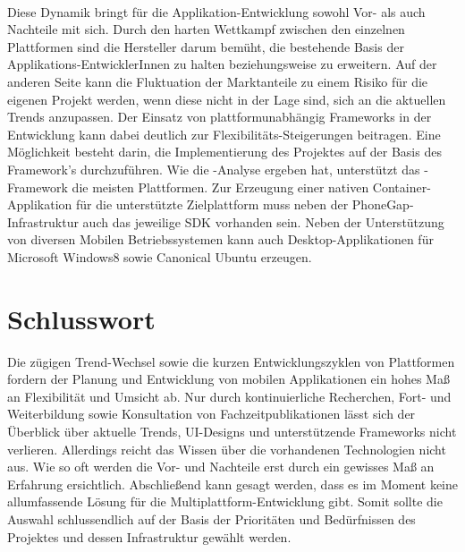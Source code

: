 \documentclass[Bachelorarbeit.tex]{subfiles}
\begin{document}
\mbox{}\\
Diese Dynamik bringt für die Applikation-Entwicklung sowohl Vor- als auch Nachteile mit sich. 
Durch den harten Wettkampf zwischen den einzelnen Plattformen sind die Hersteller darum bemüht, die bestehende Basis der Applikations-EntwicklerInnen zu halten beziehungsweise zu erweitern.
Auf der anderen Seite kann die Fluktuation der Marktanteile zu einem Risiko für die eigenen Projekt werden, wenn diese nicht in der Lage sind, sich an die aktuellen Trends anzupassen.
Der Einsatz von plattformunabhängig Frameworks in der Entwicklung kann dabei deutlich zur Flexibilitäts-Steigerungen beitragen.   
Eine Möglichkeit besteht darin, die Implementierung des Projektes auf der Basis des  Framework's durchzuführen.
Wie die -Analyse ergeben hat, unterstützt das -Framework die meisten Plattformen.
Zur Erzeugung einer nativen Container-Applikation für die  unterstützte Zielplattform muss neben der PhoneGap-Infrastruktur auch das jeweilige \ac{SDK} vorhanden sein.
Neben der Unterstützung von diversen Mobilen Betriebssystemen kann  auch Desktop-Applikationen für Microsoft Windows8 sowie Canonical Ubuntu erzeugen. \parencite[vgl.:][]{phonegapPlatformGuides}\\
\newpage
\section{Schlusswort}\label{sec:schlusswort}
Die zügigen Trend-Wechsel sowie die kurzen Entwicklungszyklen von Plattformen fordern der Planung und Entwicklung von mobilen Applikationen ein hohes Maß an Flexibilität und Umsicht ab. 
Nur durch kontinuierliche Recherchen, Fort- und Weiterbildung sowie Konsultation von Fachzeitpublikationen lässt sich der Überblick über aktuelle Trends, \ac{UI}-Designs und unterstützende Frameworks nicht verlieren.
Allerdings reicht das Wissen über die vorhandenen Technologien nicht aus. 
Wie so oft werden die Vor- und Nachteile erst durch ein gewisses Maß an Erfahrung ersichtlich.
Abschließend kann gesagt werden, dass es im Moment keine allumfassende Lösung für die Multiplattform-Entwicklung gibt.
Somit sollte die Auswahl schlussendlich auf der Basis der Prioritäten und Bedürfnissen des Projektes und dessen Infrastruktur gewählt werden.
\end{document}
